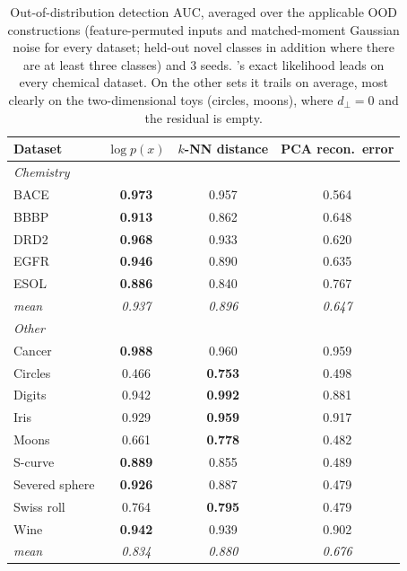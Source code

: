 \begin{table}[t]
\centering
\small
\caption{Out-of-distribution detection AUC, averaged over the applicable OOD constructions (feature-permuted inputs and matched-moment Gaussian noise for every dataset; held-out novel classes in addition where there are at least three classes) and 3 seeds. \nfmap{}'s exact likelihood leads on every chemical dataset. On the other sets it trails on average, most clearly on the two-dimensional toys (circles, moons), where $d_\perp = 0$ and the residual is empty.}
\label{tab:ad}
\begin{tabular}{lccc}
\toprule
Dataset & \nfmap{} $\log p(x)$ & $k$-NN distance & PCA recon.\ error \\
\midrule
\multicolumn{4}{l}{\textit{Chemistry}} \\
\quad BACE & \textbf{0.973} & 0.957 & 0.564 \\
\quad BBBP & \textbf{0.913} & 0.862 & 0.648 \\
\quad DRD2 & \textbf{0.968} & 0.933 & 0.620 \\
\quad EGFR & \textbf{0.946} & 0.890 & 0.635 \\
\quad ESOL & \textbf{0.886} & 0.840 & 0.767 \\
\quad \textit{mean} & \textit{0.937} & \textit{0.896} & \textit{0.647} \\
\multicolumn{4}{l}{\textit{Other}} \\
\quad Cancer & \textbf{0.988} & 0.960 & 0.959 \\
\quad Circles & 0.466 & \textbf{0.753} & 0.498 \\
\quad Digits & 0.942 & \textbf{0.992} & 0.881 \\
\quad Iris & 0.929 & \textbf{0.959} & 0.917 \\
\quad Moons & 0.661 & \textbf{0.778} & 0.482 \\
\quad S-curve & \textbf{0.889} & 0.855 & 0.489 \\
\quad Severed sphere & \textbf{0.926} & 0.887 & 0.479 \\
\quad Swiss roll & 0.764 & \textbf{0.795} & 0.479 \\
\quad Wine & \textbf{0.942} & 0.939 & 0.902 \\
\quad \textit{mean} & \textit{0.834} & \textit{0.880} & \textit{0.676} \\
\bottomrule
\end{tabular}
\end{table}
